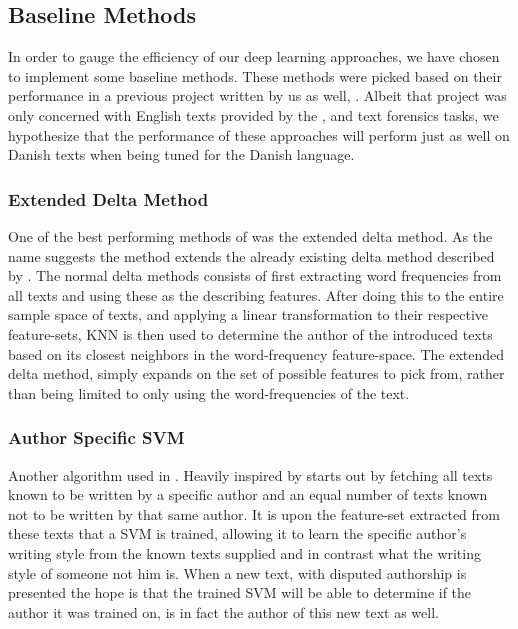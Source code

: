 \subsection{Baseline Methods}

In order to gauge the efficiency of our deep learning approaches, we have
chosen to implement some baseline methods. These methods were picked
based on their performance in a previous project written by us as well,
\cite{US}. Albeit that project was only concerned with English texts
provided by the \cite{pan:2015}, and \cite{pan:2014} text forensics tasks,
we hypothesize that the performance of these approaches will perform just
as well on Danish texts when being tuned for the Danish language.


\subsubsection{Extended Delta Method}

One of the best performing methods of \cite{US} was the extended delta method.
As the name suggests the method extends the already existing delta method
described by \cite{evert2015towards}. The normal delta methods consists of first
extracting word frequencies from all texts and using these as the describing
features. After doing this to the entire sample space of texts, and applying a
linear transformation to their respective feature-sets, \gls{KNN} is then used
to determine the author of the introduced texts based on its closest neighbors
in the word-frequency feature-space. The extended delta method, simply expands
on the set of possible features to pick from, rather than being limited to only
using the word-frequencies of the text.


\subsubsection{Author Specific SVM}

Another algorithm used in \cite{US}. Heavily inspired by \cite{hansen2014}
starts out by fetching all texts known to be written by a specific author and an
equal number of texts known not to be written by that same author. It is upon
the feature-set extracted from these texts that a \gls{SVM} is trained, allowing
it to learn the specific author's writing style from the known texts supplied
and in contrast what the writing style of someone not him is. When a new text,
with disputed authorship is presented the hope is that the trained \gls{SVM}
will be able to determine if the author it was trained on, is in fact the author
of this new text as well.


